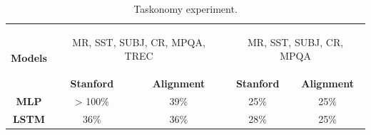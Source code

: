 
\begin{table}
	\begin{center}
		\begin{tabular}{c c c c c}
			\toprule
			\multirow{2}{*}{{\bf Models}} & \multicolumn{2}{c}{\begin{minipage}{1.1in}\begin{center}
				                                                                          MR, SST, SUBJ, CR, MPQA, TREC\end{center}\end{minipage}} & \multicolumn{2}{c}{\begin{minipage}{1.1in}\begin{center}MR, SST, SUBJ, CR, MPQA\end{center}\end{minipage}} \\
			\cmidrule(lr){2-3} \cmidrule(lr){4-5}
			& {\bf Stanford} & {\bf Alignment} & {\bf Stanford} & {\bf Alignment} \\
			\midrule
			{\bf MLP}  & > 100\% & 39\% & 25\% & 25\% \\
			{\bf LSTM} & 36\% & 36\% & 28\% & 25\% \\
			\bottomrule
		\end{tabular}
	\end{center}
	\caption{Taskonomy experiment.}
	\label{tab:taskonomy}
\end{table}


